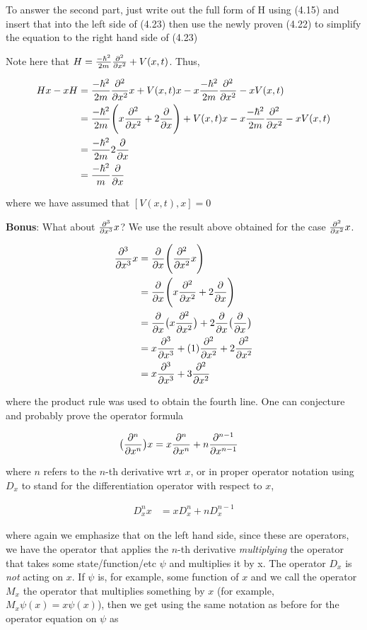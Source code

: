 \documentclass{article}
\begin{document}
To answer the second part, just write out the full form of H using (4.15) and insert that into the left side of (4.23) then use the newly proven (4.22) to simplify the equation to the right hand side of (4.23) 

Note here that $H = \frac{-\hbar^{2}}{2m}\pdv[2]{}{x} + V(x,t)$. Thus, 

\begin{align*}
    Hx -xH  &=\frac{-\hbar^{2}}{2m}\pdv[2]{}{x}x + V(x,t)x - x\frac{-\hbar^{2}}{2m}\pdv[2]{}{x} - xV(x,t) \\
     &=\frac{-\hbar^{2}}{2m}\Bigg( x\pdv[2]{}{x} + 2 \pdv{}{x} \Bigg) + V(x,t)x - x\frac{-\hbar^{2}}{2m}\pdv[2]{}{x} - xV(x,t) \\
      &=\frac{-\hbar^{2}}{2m}2\pdv{}{x} \\
      &= \frac{-\hbar^{2}}{m}\pdv{}{x}
\end{align*}

where we have assumed that $[V(x,t),x]=0$

\textbf{Bonus}:
What about $\pdv[3]{}{x}x$? We use the result above obtained for the case  $\pdv[2]{}{x}x$.

\begin{align*}
    \pdv[3]{}{x}x  &=\pdv{}{x} \Bigg( \pdv[2]{}{x}x \Bigg) \\
     &=\pdv{}{x} \Bigg( x\pdv[2]{}{x} + 2\pdv{}{x}  \Bigg) \\
      &=\pdv{}{x}\big( x\pdv[2]{}{x} \big) + 2\pdv{}{x}\big( \pdv[]{}{x} \big)  \\
      &= x\pdv[3]{}{x} + (1)\pdv[2]{}{x} + 2\pdv[2]{}{x}   \\
      &= x\pdv[3]{}{x} + 3\pdv[2]{}{x}
\end{align*}

where the product rule was used to obtain the fourth line. One can conjecture and probably prove the operator formula 

\begin{align*}
    \big( \pdv[n]{}{x} \big) x  &=x\pdv[n]{}{x} + n\pdv[n-1]{}{x}
\end{align*}

where $n$ refers to the $n$-th derivative wrt $x$, or in proper operator notation using $D_{x}$ to stand for the differentiation operator with respect to $x$, 

\begin{align*}
    D_{x}^{n} x  &=xD_{x}^{n} + nD_{x}^{n-1}
\end{align*}

where again we emphasize that on the left hand side, since these are operators, we have the operator that applies the $n$-th derivative \textit{multiplying} the operator that takes some state/function/etc $\psi$ and multiplies it by x. The operator $D_{x}$ is \textit{not} acting on $x$. If $\psi$ is, for example, some function of $x$ and we call the operator $M_{x}$ the operator that multiplies something by $x$ (for example, $M_{x} \psi(x) = x\psi (x)$), then we get using the same notation as before for the operator equation on $\psi$ as 
\end{document}
